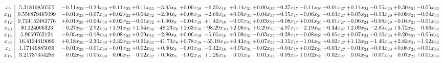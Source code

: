 \documentclass[9pt]{article}
\begin{document}
 \[\begin{array}{c| c c@{\hskip 2pt} c@{\hskip 2pt} c@{\hskip 2pt} c@{\hskip 2pt} c@{\hskip 2pt} c@{\hskip 2pt} c@{\hskip 2pt} c@{\hskip 2pt} c@{\hskip 2pt} c@{\hskip 2pt} c@{\hskip 2pt} c@{\hskip 2pt} c@{\hskip 2pt} c@{\hskip 2pt} c@{\hskip 2pt} c@{\hskip 2pt} }
 x_{9}   &  5.31819850555 & -0.11 x_{23} & -0.24 x_{30} & +  0.11 x_{22} & +  0.11 x_{32} & -3.95 x_{8} & +  0.09 x_{18} & -6.30 x_{10} & +  0.14 x_{31} & +  0.00 x_{35} & -0.37 x_{17} & -0.11 x_{26} & +  0.01 x_{27} & +  0.14 x_{24} & -0.15 x_{29} & +  0.30 x_{21} & -0.05 x_{33}\\
 x_{11}   &  0.556879465099 & -0.01 x_{23} & -0.07 x_{30} & +  0.02 x_{22} & +  0.04 x_{32} & -2.00 x_{8} & +  0.08 x_{18} & -2.69 x_{10} & +  0.09 x_{31} & -0.04 x_{35} & -0.15 x_{17} & -0.06 x_{26} & -0.03 x_{27} & +  0.05 x_{24} & -0.13 x_{29} & +  0.09 x_{21} & -0.04 x_{33}\\
 x_{12}   &  0.724152482776 & +  0.01 x_{23} & +  0.04 x_{30} & +  0.02 x_{22} & -0.01 x_{32} & +  1.40 x_{8} & -0.04 x_{18} & +  1.42 x_{10} & -0.07 x_{31} & +  0.03 x_{35} & +  0.08 x_{17} & +  0.04 x_{26} & -0.01 x_{27} & -0.06 x_{24} & +  0.08 x_{29} & -0.04 x_{21} & -0.01 x_{33}\\
 x_{20}   &  30.224066323 & -0.27 x_{23} & -2.92 x_{30} & +  1.91 x_{22} & +  1.54 x_{32} & -48.23 x_{8} & +  1.63 x_{18} & -98.29 x_{10} & +  2.06 x_{31} & +  0.29 x_{35} & -4.97 x_{17} & -2.19 x_{26} & -0.34 x_{27} & +  2.09 x_{24} & -2.85 x_{29} & +  3.72 x_{21} & -0.66 x_{33}\\
 x_{13}   &  5.9659762124 & -0.05 x_{23} & -0.18 x_{30} & +  0.08 x_{22} & +  0.09 x_{32} & -2.80 x_{8} & +  0.06 x_{18} & -5.05 x_{10} & +  0.09 x_{31} & -0.03 x_{35} & -0.28 x_{17} & -0.08 x_{26} & +  0.05 x_{27} & +  0.07 x_{24} & -0.10 x_{29} & +  0.20 x_{21} & -0.05 x_{33}\\
 x_{25}   &  16.4134419096 & +  0.18 x_{23} & -2.30 x_{30} & +  2.32 x_{22} & +  0.91 x_{32} & -41.73 x_{8} & +  0.78 x_{18} & -55.19 x_{10} & +  0.43 x_{31} & +  0.07 x_{35} & -3.11 x_{17} & -1.04 x_{26} & +  0.02 x_{27} & +  1.13 x_{24} & -1.40 x_{29} & +  2.83 x_{21} & -1.02 x_{33}\\
 x_{2}   &  1.17146885039 & -0.01 x_{23} & -0.01 x_{30} & -0.01 x_{22} & +  0.02 x_{32} & +  0.40 x_{8} & -0.01 x_{18} & -0.42 x_{10} & +  0.05 x_{31} & -0.02 x_{35} & -0.04 x_{17} & +  0.02 x_{26} & +  0.03 x_{27} & -0.01 x_{24} & +  0.04 x_{29} & +  0.08 x_{21} & +  0.01 x_{33}\\
 x_{15}   &  3.21737454288 & -0.02 x_{23} & +  0.05 x_{30} & -0.06 x_{22} & -0.02 x_{32} & +  0.96 x_{8} & -0.02 x_{18} & +  1.26 x_{10} & -0.01 x_{31} & -0.01 x_{35} & +  0.09 x_{17} & +  0.02 x_{26} & +  0.02 x_{27} & -0.04 x_{24} & +  0.07 x_{29} & -0.07 x_{21} & +  0.01 x_{33}\\

\end{array}\]
\end{document}
